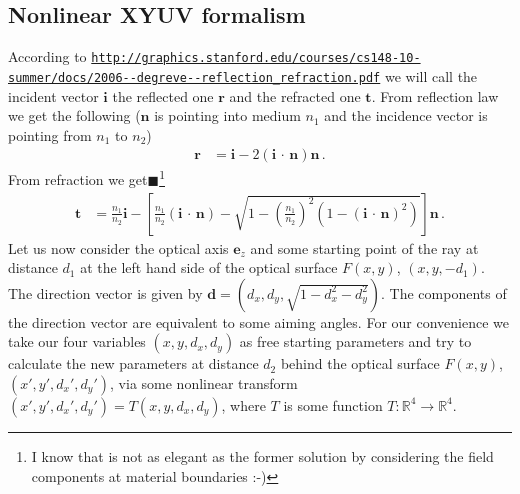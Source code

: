 \documentclass[12pt,a4paper,twoside,openright,BCOR10mm,headsepline,titlepage,abstracton,chapterprefix,final]{scrreprt}
\newcommand\Vector[1]{{\mathbf{#1}}}
\newcommand{\scpm}[2]{(#1\,\cdot\,#2)}
\newcommand{\remark}[1]{{\color{red}$\blacksquare$}\footnote{{\color{red}#1}}}
\begin{document}
\subsection{Nonlinear XYUV formalism}
According to {{\tt \url{http://graphics.stanford.edu/courses/cs148-10-summer/docs/2006--degreve--reflection_refraction.pdf}}}
we will call the incident vector $\Vector{i}$ the reflected one $\Vector{r}$ and the refracted one $\Vector{t}$.
From reflection law we get the following ($\Vector{n}$ is pointing into medium $n_1$ and the incidence vector is pointing from $n_1$ to $n_2$)
\begin{align}
 \Vector{r} &= \Vector{i} - 2 \scpm{\Vector{i}}{\Vector{n}} \Vector{n}\,.\label{eq:reflection_vector}
\end{align}
From refraction we get\remark{I know that is not as elegant as the former 
solution by considering the field components at material boundaries :-)}
\begin{align}
 \Vector{t} &= \frac{n_1}{n_2} \Vector{i} 
 - \left[\frac{n_1}{n_2} \scpm{\Vector{i}}{\Vector{n}} 
      - \sqrt{1 - \left(\frac{n_1}{n_2}\right)^2 (1 - {\scpm{\Vector{i}}{\Vector{n}}}^2)}\right] \Vector{n}\,.\label{eq:refraction_vector}
\end{align}
Let us now consider the optical axis $\Vector{e}_z$ and some starting point of the ray at distance $d_1$ at the left hand side
of the optical surface $F(x, y)$, $(x,y,-d_1)$. The direction vector is given by $\Vector{d} = (d_x, d_y, \sqrt{1 - d_x^2 - d_y^2})$.
The components of the direction vector are equivalent to some aiming angles. For our convenience we take our
four variables $(x, y, d_x, d_y)$ as free starting parameters and try to calculate the new parameters at distance $d_2$ behind the
optical surface $F(x, y)$, $(x', y', {d_x}', {d_y}')$, via some nonlinear transform $(x', y', {d_x}', {d_y}') = T(x, y, d_x, d_y)$,
where $T$ is some function $T:\mathbb{R}^4 \to \mathbb{R}^4$.
\end{document}
